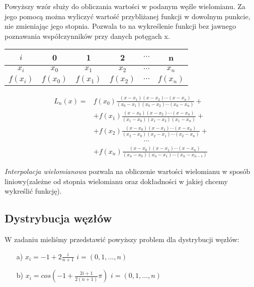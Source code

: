 \documentclass{article}
\begin{document}
  Powyższy wzór służy do obliczania wartości w podanym węźle wielomianu. Za jego pomocą można wyliczyć wartość przybliżanej funkcji w dowolnym punkcie, nie zmieniając jego stopnia. Pozwala to na wykreślenie funkcji bez jawnego poznawania współczynników przy danych potęgach x.
  \begin{table}[h]
    \centering
    \begin{tabular}{|c|c|c|c|c|c|}
        \hline
        $i$ & 0 & 1 & 2 & $\cdots$ & n \\
        \hline
        $x_i$ & $x_0$ & $x_1$ & $x_2$ & $\cdots$ & $x_n$ \\
        \hline
        $f(x_i)$ & $f(x_0)$ & $f(x_1)$ & $f(x_2)$ & $\cdots$ & $f(x_n)$ \\
        \hline
    \end{tabular}
\end{table}

\begin{center}
  \begin{align*}
      L_n(x) = & f(x_0) \frac{(x - x_1)(x - x_2)\cdots(x - x_n)}{(x_0 - x_1)(x_0 - x_2)\cdots(x_0 - x_n)} +\\
      & + f(x_1) \frac{(x - x_0)(x - x_2)\cdots(x - x_n)}{(x_1 - x_0)(x_1 - x_2)(x_1 - x_n)} + \\
      & + f(x_2) \frac{(x - x_0)(x - x_1)\cdots(x - x_n)}{(x_2 - x_0)(x_2 - x_1)\cdots(x_2 - x_n)} + \\
      & \hspace{3cm} \cdots \\
      & + f(x_n) \frac{(x - x_0)(x - x_1)\cdots(x - x_n)}{(x_n - x_0)(x_n - x_1)\cdots(x_n - x_{n-1})}
  \end{align*}
\end{center}

  \textit{Interpolacja wielomianowa} pozwala na obliczenie wartości wielomianu w sposób liniowy(zależne od stopnia wielomianu oraz dokładności w jakiej chcemy wykreślić funkcję).

  \subsection{Dystrybucja węzłów}
  W zadaniu mieliśmy przedstawić powyższy problem dla dystrybucji węzłów:
  \begin{enumerate}
    \item[a)] $x_i = -1 + 2\frac{i}{n+1}$ \qquad $i = (0,1, ..., n)$
    \item[b)] $x_i = cos( -1 + \frac{2i+1}{2(n+1)}\pi)$ \qquad $i = (0,1, ..., n)$
  \end{enumerate}
\end{document}
